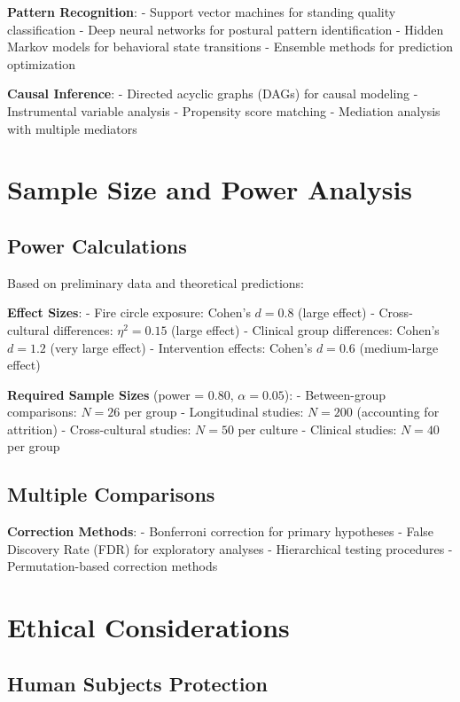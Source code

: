 \documentclass[12pt]{article}
\begin{document}
\textbf{Pattern Recognition}:
- Support vector machines for standing quality classification
- Deep neural networks for postural pattern identification
- Hidden Markov models for behavioral state transitions
- Ensemble methods for prediction optimization

\textbf{Causal Inference}:
- Directed acyclic graphs (DAGs) for causal modeling
- Instrumental variable analysis
- Propensity score matching
- Mediation analysis with multiple mediators

\section{Sample Size and Power Analysis}

\subsection{Power Calculations}

Based on preliminary data and theoretical predictions:

\textbf{Effect Sizes}:
- Fire circle exposure: Cohen's $d = 0.8$ (large effect)
- Cross-cultural differences: $\eta^2 = 0.15$ (large effect)
- Clinical group differences: Cohen's $d = 1.2$ (very large effect)
- Intervention effects: Cohen's $d = 0.6$ (medium-large effect)

\textbf{Required Sample Sizes} (power = 0.80, $\alpha = 0.05$):
- Between-group comparisons: $N = 26$ per group
- Longitudinal studies: $N = 200$ (accounting for attrition)
- Cross-cultural studies: $N = 50$ per culture
- Clinical studies: $N = 40$ per group

\subsection{Multiple Comparisons}

\textbf{Correction Methods}:
- Bonferroni correction for primary hypotheses
- False Discovery Rate (FDR) for exploratory analyses
- Hierarchical testing procedures
- Permutation-based correction methods

\section{Ethical Considerations}

\subsection{Human Subjects Protection}
\end{document}
